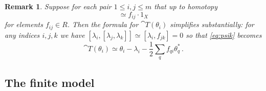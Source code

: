 \documentclass[english,letter paper,12pt,leqno]{article}
\theoremstyle{example}
\newtheorem{remark}[theorem]{Remark}
\numberwithin{equation}{section}
\def\be{\begin{equation}}
\def\ee{\end{equation}}
\begin{document}
\begin{remark}\label{remark:cancellations_transfer} Suppose for each pair $1 \le i,j \le m$ that up to homotopy
\be
[\lambda_i, \lambda_j] \simeq f_{ij} \cdot 1_X
\ee
for elements $f_{ij} \in R$. Then the formula for $\cat{T}(\theta_i)$ simplifies substantially: for any indices $i,j,k$ we have $[\lambda_i, [\lambda_j, \lambda_k]] \simeq [\lambda_i, f_{jk}] = 0$ so that \eqref{eq:psik} becomes
\be
\cat{T}(\theta_i) \simeq \theta_i - \lambda_i - \frac{1}{2} \sum_q f_{qi} \theta^*_q\,.
\ee
\end{remark}

\subsection{The finite model}\label{section:theequivalence}
\end{document}
